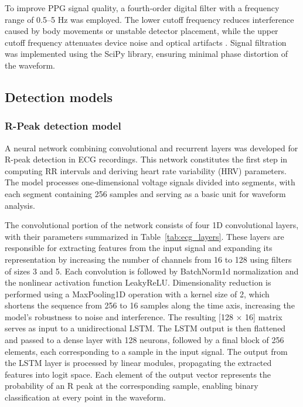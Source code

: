 \documentclass{citask}
\begin{document}
To improve PPG signal quality, a fourth-order digital filter with a frequency range of 0.5–5 Hz was employed. The lower cutoff frequency reduces interference caused by body movements or unstable detector placement, while the upper cutoff frequency attenuates device noise and optical artifacts \cite{26}. Signal filtration was implemented using the SciPy library, ensuring minimal phase distortion of the waveform.

\subsection{Detection models}
\subsubsection{R-Peak detection model}
A neural network combining convolutional and recurrent layers was developed for R-peak detection in ECG recordings. This network constitutes the first step in computing RR intervals and deriving heart rate variability (HRV) parameters. The model processes one-dimensional voltage signals divided into segments, with each segment containing 256 samples and serving as a basic unit for waveform analysis.

The convolutional portion of the network consists of four 1D convolutional layers, with their parameters summarized in Table~\ref{tab:ecg_layers}. These layers are responsible for extracting features from the input signal and expanding its representation by increasing the number of channels from 16 to 128 using filters of sizes 3 and 5. Each convolution is followed by BatchNorm1d normalization and the nonlinear activation function LeakyReLU. Dimensionality reduction is performed using a MaxPooling1D operation with a kernel size of 2, which shortens the sequence from 256 to 16 samples along the time axis, increasing the model’s robustness to noise and interference. The resulting [128 × 16] matrix serves as input to a unidirectional LSTM. The LSTM output is then flattened and passed to a dense layer with 128 neurons, followed by a final block of 256 elements, each corresponding to a sample in the input signal. The output from the LSTM layer is processed by linear modules, propagating the extracted features into logit space. Each element of the output vector represents the probability of an R peak at the corresponding sample, enabling binary classification at every point in the waveform.
\end{document}
